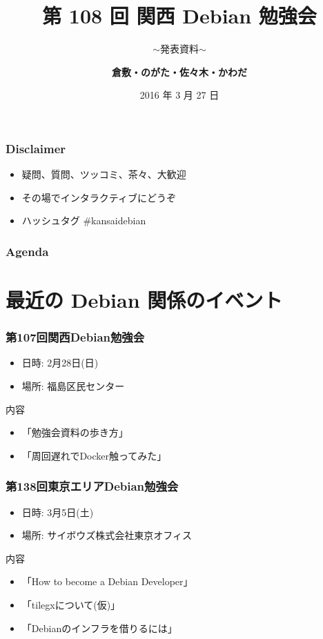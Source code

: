 \documentclass[cjk,dvipdfmx,10pt,compress,%
hyperref={bookmarks=true,bookmarksnumbered=true,bookmarksopen=false,%
colorlinks=false,%
pdftitle={第 108 回 関西 Debian 勉強会},%
pdfauthor={倉敷・のがた・佐々木・かわだ},%
pdfsubject={資料},%
}]{beamer}
\title{第 108 回 関西 Debian 勉強会}
\subtitle{$\sim$発表資料$\sim$}
\author[かわだ てつたろう]{{\large\bf 倉敷・のがた・佐々木・かわだ}}
\institute[Debian JP]{{\normalsize\tt 関西 Debian 勉強会}}
\date{{\small 2016 年 3 月 27 日}}
\begin{document}
\settitleslide
\begin{frame}
\titlepage
\end{frame}
\setdefaultslide

\begin{frame}[fragile]
  \frametitle{Disclaimer}
  \begin{itemize}
  \item 疑問、質問、ツッコミ、茶々、\alert{大歓迎}
  \item その場でインタラクティブにどうぞ
  \item ハッシュタグ \#kansaidebian
  \end{itemize}
\end{frame}

\begin{frame}[fragile]
\frametitle{Agenda}

\tableofcontents

\end{frame}

\section{最近の Debian 関係のイベント}


\begin{frame}[fragile]
  \frametitle{第107回関西Debian勉強会}
  \begin{itemize}
  \item 日時: 2月28日(日)
  \item 場所: 福島区民センター
  \end{itemize}
  \begin{block}{内容}
    \begin{itemize}
    \item 「勉強会資料の歩き方」
    \item 「周回遅れでDocker触ってみた」
    \end{itemize}
  \end{block}
\end{frame}

\begin{frame}[fragile]
  \frametitle{第138回東京エリアDebian勉強会}
  \begin{itemize}
  \item 日時: 3月5日(土)
  \item 場所: サイボウズ株式会社東京オフィス
  \end{itemize}
  \begin{block}{内容}
    \begin{itemize}
    \item 「How to become a Debian Developer」
    \item 「tilegxについて(仮)」
    \item 「Debianのインフラを借りるには」
    \end{itemize}
  \end{block}
\end{frame}
\end{document}
